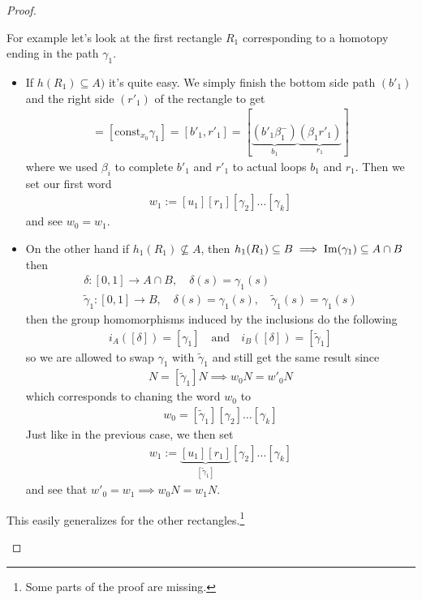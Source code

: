 \begin{proof}
\begin{enumerate}
    For example let's look at the first rectangle $R_1$ corresponding to a homotopy ending in the path $\gamma_1$.
    \begin{itemize}
      \item If $h(R_1) \subseteq A)$ it's quite easy. We simply finish the bottom side path $({b'}_1)$ and the right side $({r'}_1)$ of the rectangle to get
        \begin{align*}
          [\gamma_1] = [\text{const}_{x_0} \gamma_1] = [{b'}_1,{r'}_1] = [\underbrace{({b'}_1 \beta_1^{-})}_{b_1}\underbrace{(\beta_1 {r'}_1)}_{r_1}]
        \end{align*}
        where we used $\beta_i$ to complete ${b'}_1$ and ${r'}_1$ to actual loops $b_1$ and $r_1$.
        Then we set our first word
        \begin{align*}
          w_1 := [u_1][r_1][\gamma_2] \dots [\gamma_k]
        \end{align*}
        and see $w_0 = w_1$.
      \item On the other hand if $h_1(R_1) \nsubseteq A$, then $h_1(R_1) \subseteq B \implies \operatorname{Im}(\gamma_1) \subseteq A \cap B$ then
        \begin{align*}
          \delta:[0,1] \to  A \cap B, \quad \delta(s) = \gamma_1(s)\\
          \tilde{\gamma}_1:[0,1] \to  B, \quad \delta(s) = \gamma_1(s), \quad \tilde{\gamma}_1(s) = \gamma_1(s)
        \end{align*}
        then the group homomorphisms induced by the inclusions do the following
        \begin{align*}
          i_A([\delta]) = [\gamma_1] \quad \text{and} \quad i_B([\delta]) = [\tilde{\gamma}_1]
        \end{align*}
        so we are allowed to swap $\gamma_1$ with $\tilde{\gamma}_1$ and still get the same result since
        \begin{align*}
          [\gamma_1]N = [\tilde{\gamma}_1]N \implies w_0 N = {w'}_0 N
        \end{align*}
        which corresponds to chaning the word $w_0$ to
        \begin{align*}
          {w}_0 = [\tilde{\gamma}_1] [\gamma_2] \dots [\gamma_k]
        \end{align*}
        Just like in the previous case, we then set 
        \begin{align*}
          w_1 := \underbrace{[u_1][r_1]}_{[\tilde{\gamma}_1]}[\gamma_2] \dots [\gamma_k]
        \end{align*}
        and see that ${w'}_0 = w_1 \implies w_0N = w_1N$.
    \end{itemize}
    This easily generalizes for the other rectangles.\footnote{Some parts of the proof are missing.}
\end{enumerate}

\end{proof}







